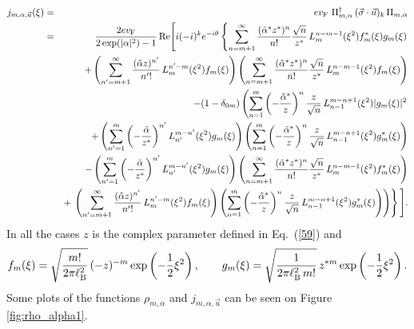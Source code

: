 \documentclass[aps,showpacs,showkeys]{revtex4}
\begin{document}
\begin{eqnarray*}
	\nonumber  j_{m,\alpha,\vec{u}}(\xi)&=&ev_{\rm F}\ \Pi^{\dagger}_{m,\alpha} \,(\vec{\sigma}\cdot\vec{u})_k\,
	\Pi_{m,\alpha} \\
	\nonumber&=&\frac{2ev_{\rm F}}{2\exp(\vert\alpha\vert^2)-1}\, \textrm{Re}\Bigg[i(-i)^{k}e^{-i\theta}\left\{\sum_{n=m+1}^{\infty}\frac{(\tilde{\alpha}^\ast z^\ast)^{n}}{n!}\frac{\sqrt{n}}{z^\ast}\, L_{m}^{n-m-1}(\xi^2)f_m^\ast(\xi)g_m(\xi)\right.\\
	\nonumber&&+\left(\sum_{n'=m+1}^{\infty}\frac{(\tilde{\alpha}z)^{n'}}{n'!}\, L_{m}^{n'-m}(\xi^2)f_m(\xi)\right)\left(\sum_{n=m+1}^{\infty}\frac{(\tilde{\alpha}^\ast z^\ast)^{n}}{n!}\frac{\sqrt{n}}{z^\ast}\,  L_{m}^{n-m-1}(\xi^2)f_m(\xi)\right)\\
	\nonumber&&-(1-\delta_{0m})\left(\sum_{n=1}^{m}\left(-\frac{\tilde{\alpha}^\ast}{z}\right)^n\frac{z}{\sqrt{n}}\, L_{n-1}^{m-n+1}(\xi^2)\vert g_m(\xi)\vert^2\right. \\
	\nonumber&&+\left(\sum_{n'=1}^{m}\left(-\frac{\tilde{\alpha}}{z^\ast}\right)^{n'}L_{n'}^{m-n'}(\xi^2)g_m(\xi)\right)\left(\sum_{n=1}^{m}\left(-\frac{\tilde{\alpha}^\ast}{z}\right)^n\frac{z}{\sqrt{n}}\, L_{n-1}^{m-n+1}(\xi^2)g_m^\ast(\xi)\right) \\
	\nonumber&&-\left(\sum_{n'=1}^{m}\left(-\frac{\tilde{\alpha}}{z^\ast}\right)^{n'} L_{n'}^{m-n'}(\xi^2)g_m(\xi)\right)\left(\sum_{n=m+1}^{\infty}\frac{(\tilde{\alpha}^\ast z^\ast)^{n}}{n!}\frac{\sqrt{n}}{z^\ast}\, L_{m}^{n-m-1}(\xi^2)f_m^\ast(\xi)\right) \\
	&&+\left.\left.\left(\sum_{n'=m+1}^{\infty}\frac{(\tilde{\alpha}z)^{n'}}{n'!}\, L_{m}^{n'-m}(\xi^2)f_m(\xi)\right)\left(\sum_{n=1}^{m}\left(-\frac{\tilde{\alpha}^\ast}{z}\right)^{n}\frac{z}{\sqrt{n}}\, L_{n-1}^{m-n+1}(\xi^2)g_m^\ast(\xi)\right)\right)\right\}\Bigg]. \label{80b}
\end{eqnarray*}
In all the cases $z$ is the complex parameter defined in Eq.~(\ref{59}) and
\begin{equation*}
	f_{m}(\xi)=\sqrt{\frac{m!}{2\pi\ell_{\rm B}^{2}}}\,(-z)^{-m}\exp\left(-\frac{1}{2}\xi^2\right), \qquad 
	g_{m}(\xi)=\sqrt{\frac{1}{2\pi\ell_{\rm B}^{2}\,m!}}\,z^{\ast m}\exp\left(-\frac{1}{2}\xi^2\right).
\end{equation*}
Some plots of the functions $\rho_{m,\alpha}$ and $j_{m,\alpha,\vec{u}}$ can be seen on Figure \ref{fig:rho_alpha1}.
\end{document}
